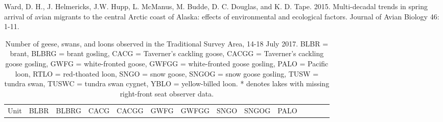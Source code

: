 \documentclass[]{article}
\begin{document}
Ward, D. H., J. Helmericks, J.W. Hupp, L. McManus, M. Budde, D. C.
Douglas, and K. D. Tape. 2015. Multi-decadal trends in spring arrival of
avian migrants to the central Arctic coast of Alaska: effects of
environmental and ecological factors. Journal of Avian Biology 46: 1-11.
\newpage
\footnotesize
{%
\begin{longtable}[]{@{}rrrrrrrrrrrrrr@{}}
\caption{Number of geese, swans, and loons observed in the Traditional
Survey Area, 14-18 July 2017. BLBR = brant, BLBRG = brant gosling, CACG
= Taverner's cackling goose, CACGG = Taverner's cackling goose gosling,
GWFG = white-fronted goose, GWFGG = white-fronted goose gosling, PALO =
Pacific loon, RTLO = red-thoated loon, SNGO = snow goose, SNGOG = snow
goose gosling, TUSW = tundra swan, TUSWC = tundra swan cygnet, YBLO =
yellow-billed loon. * denotes lakes with missing right-front seat
observer data.}\tabularnewline
\toprule
\begin{minipage}[b]{0.05\columnwidth}\raggedleft\strut
Unit\strut
\end{minipage} & \begin{minipage}[b]{0.05\columnwidth}\raggedleft\strut
BLBR\strut
\end{minipage} & \begin{minipage}[b]{0.05\columnwidth}\raggedleft\strut
BLBRG\strut
\end{minipage} & \begin{minipage}[b]{0.04\columnwidth}\raggedleft\strut
CACG\strut
\end{minipage} & \begin{minipage}[b]{0.05\columnwidth}\raggedleft\strut
CACGG\strut
\end{minipage} & \begin{minipage}[b]{0.05\columnwidth}\raggedleft\strut
GWFG\strut
\end{minipage} & \begin{minipage}[b]{0.05\columnwidth}\raggedleft\strut
GWFGG\strut
\end{minipage} & \begin{minipage}[b]{0.04\columnwidth}\raggedleft\strut
SNGO\strut
\end{minipage} & \begin{minipage}[b]{0.05\columnwidth}\raggedleft\strut
SNGOG\strut
\end{minipage} & \begin{minipage}[b]{0.04\columnwidth}\raggedleft\strut
PALO\strut
\end{minipage} & \begin{minipage}[b]{0.04\columnwidth}\raggedleft\strut

\end{minipage}
\end{longtable}}
\end{document}
